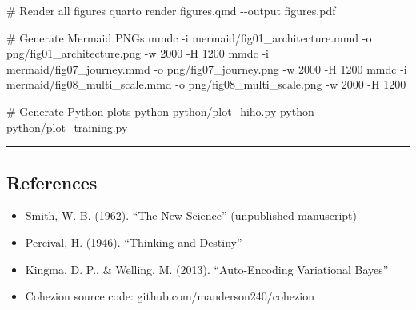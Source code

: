 \documentclass[
  letterpaper,
  DIV=11,
  numbers=noendperiod]{scrartcl}
\newenvironment{Shaded}{\begin{snugshade}}{\end{snugshade}}
\newcommand{\AttributeTok}[1]{\textcolor[rgb]{0.40,0.45,0.13}{#1}}
\newcommand{\CommentTok}[1]{\textcolor[rgb]{0.37,0.37,0.37}{#1}}
\newcommand{\ExtensionTok}[1]{\textcolor[rgb]{0.00,0.23,0.31}{#1}}
\newcommand{\NormalTok}[1]{\textcolor[rgb]{0.00,0.23,0.31}{#1}}
\providecommand{\tightlist}{%
  \setlength{\itemsep}{0pt}\setlength{\parskip}{0pt}}\usepackage{longtable,booktabs,array}
\begin{document}
\begin{Shaded}
\begin{Highlighting}[]
\CommentTok{\# Render all figures}
\ExtensionTok{quarto}\NormalTok{ render figures.qmd }\AttributeTok{{-}{-}output}\NormalTok{ figures.pdf}

\CommentTok{\# Generate Mermaid PNGs}
\ExtensionTok{mmdc} \AttributeTok{{-}i}\NormalTok{ mermaid/fig01\_architecture.mmd }\AttributeTok{{-}o}\NormalTok{ png/fig01\_architecture.png }\AttributeTok{{-}w}\NormalTok{ 2000 }\AttributeTok{{-}H}\NormalTok{ 1200}
\ExtensionTok{mmdc} \AttributeTok{{-}i}\NormalTok{ mermaid/fig07\_journey.mmd }\AttributeTok{{-}o}\NormalTok{ png/fig07\_journey.png }\AttributeTok{{-}w}\NormalTok{ 2000 }\AttributeTok{{-}H}\NormalTok{ 1200}
\ExtensionTok{mmdc} \AttributeTok{{-}i}\NormalTok{ mermaid/fig08\_multi\_scale.mmd }\AttributeTok{{-}o}\NormalTok{ png/fig08\_multi\_scale.png }\AttributeTok{{-}w}\NormalTok{ 2000 }\AttributeTok{{-}H}\NormalTok{ 1200}

\CommentTok{\# Generate Python plots}
\ExtensionTok{python}\NormalTok{ python/plot\_hiho.py}
\ExtensionTok{python}\NormalTok{ python/plot\_training.py}
\end{Highlighting}
\end{Shaded}

\begin{center}\rule{0.5\linewidth}{0.5pt}\end{center}

\subsection{References}\label{references}

\begin{itemize}
\tightlist
\item
  Smith, W. B. (1962). ``The New Science'' (unpublished manuscript)
\item
  Percival, H. (1946). ``Thinking and Destiny''
\item
  Kingma, D. P., \& Welling, M. (2013). ``Auto-Encoding Variational
  Bayes''
\item
  Cohezion source code: github.com/manderson240/cohezion
\end{itemize}
\end{document}
